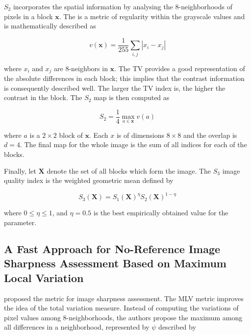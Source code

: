 $S_{2}$ incorporates the spatial information by analysing the 8-neighborhoods of pixels in a block $\mathbf{x}$. The  is a metric of regularity within the grayscale values and is mathematically described as

\begin{equation}
\label{eqn:total_variation}
v(\mathbf{x}) = \frac{1}{255}\sum_{i,j}\left|x_{i} - x_{j}\right|
\end{equation}

\noindent where $x_{i}$ and $x_{j}$ are 8-neighbors in $\mathbf{x}$. The TV provides a good representation of the absolute differences in each block; this implies that the contrast information is consequently described well. The larger the TV index is, the higher the contrast in the block. The $S_{2}$ map is then computed as

\begin{equation}
\label{eqn:spatial_s2}
S_{2} = \frac{1}{4} \max_{a \in \mathbf{x}} v(a)
\end{equation}

\noindent where $a$ is a $2 \times 2$ block of $\mathbf{x}$. Each $x$ is of dimensions $8 \times 8$ and the overlap is $d = 4$. The final map for the whole image is the sum of all indices for each of the blocks.

Finally, let $\mathbf{X}$ denote the set of all blocks which form the image. The $S_{3}$ image quality index is the weighted geometric mean defined by

\begin{equation}
\label{eqn:s3_index}
S_{3}(\mathbf{X}) = S_{1}(\mathbf{X})^{\eta} S_{2}(\mathbf{X})^{1 - \eta}
\end{equation}

\noindent where $0 \leq \eta \leq 1$, and $\eta = 0.5$ is the best empirically obtained value for the parameter.

\subsection{A Fast Approach for No-Reference Image Sharpness Assessment Based on Maximum Local Variation}

 proposed the  metric for image sharpness assessment. The MLV metric improves the idea of the total variation measure. Instead of computing the variations of pixel values among 8-neighborhoods, the authors propose the maximum among all differences in a neighborhood, represented by $\psi$ described by


